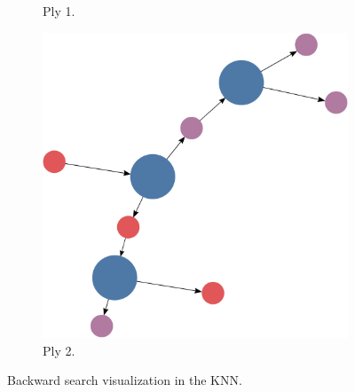 \documentclass[titlepage,11pt]{article}
\begin{document}
\begin{figure}[!htb]
\begin{subfigure}[!htb]{0.32\textwidth}
		\caption{Ply 1.}
	\end{subfigure}
	\begin{subfigure}[!htb]{0.32\textwidth}
		\centering
		\includegraphics[width=\columnwidth]{figures/knn_simple_backward_think_2.pdf}
		\caption{Ply 2.}
	\end{subfigure}
	\caption{Backward search visualization in the KNN.}
	\label{fig:backward_search_test}
\end{figure}
\end{document}
